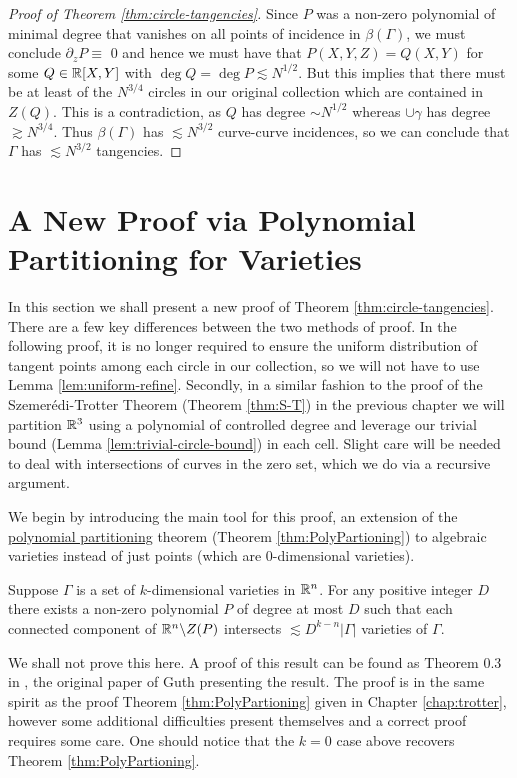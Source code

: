\begin{proof}[Proof of Theorem \ref{thm:circle-tangencies}]
    Since $P$ was a non-zero polynomial of minimal degree that vanishes on all points of incidence in $\beta (\Gamma)$, we must conclude 
    $\partial_z P \equiv$ 0 and hence we must have that $P(X,Y,Z) = Q(X,Y)$ for some $Q \in \mathbb R[X,Y]$ with  $ \deg Q = \deg P \lesssim N^{1/2}$. 
    But this implies that there must be at least of the $N^{3/4}$ circles in our original collection which are contained in $Z(Q)$.
    This is a contradiction, as $Q$ has degree $\sim N^{1/2}$ whereas $\cup \gamma$ has degree $ \gtrsim N^{3/4}$.
    Thus $\beta(\Gamma)$ has $\lesssim N^{3/2}$ curve-curve incidences, so we can conclude that $\Gamma$ has $\lesssim N^{3/2}$ tangencies.
\end{proof}

\section[New Proof via Polynomial Partitioning]{A New Proof via Polynomial Partitioning for Varieties}
In this section we shall present a new proof of Theorem \ref{thm:circle-tangencies}. 
There are a few key differences between the two methods of proof. In the following proof, 
it is no longer required to ensure the uniform distribution of tangent points among each circle in our collection, so we will not
have to use Lemma \ref{lem:uniform-refine}.
Secondly, in a similar fashion to the proof of the Szemerédi-Trotter Theorem (Theorem \ref{thm:S-T}) in the previous chapter we will partition $\mathbb R^3$ using a polynomial of controlled degree and leverage our trivial bound (Lemma \ref{lem:trivial-circle-bound}) in each cell.
Slight care will be needed to deal with intersections of curves in the zero set, which we do via a recursive  argument.

We begin by introducing the main tool for this proof, 
an extension of the \hyperref[thm:PolyPartioning]{polynomial partitioning} theorem (Theorem \ref{thm:PolyPartioning}) to algebraic varieties instead of just points (which are 0-dimensional varieties). 

\begin{lemma}
    Suppose $\Gamma$ is a set of $k$-dimensional varieties in $\mathbb R^n$. For any positive integer $D$ there exists a non-zero polynomial $P$ of degree at
    most $D$ such that each connected component of $\mathbb R^n \backslash Z(P)$ intersects $\lesssim D^{k-n} |\Gamma|$ varieties of $\Gamma$.\label{lem:poly-part-var}
\end{lemma}
We shall not prove this here. A proof of this result can be found as Theorem 0.3 in \cite{guth2015polypartvar}, the original paper of Guth presenting the result. The proof is in the same spirit as the proof Theorem \ref{thm:PolyPartioning} given in Chapter \ref{chap:trotter}, however some additional difficulties present themselves and a correct proof requires some care. One should notice that the $k=0$ case above recovers Theorem \ref{thm:PolyPartioning}.

